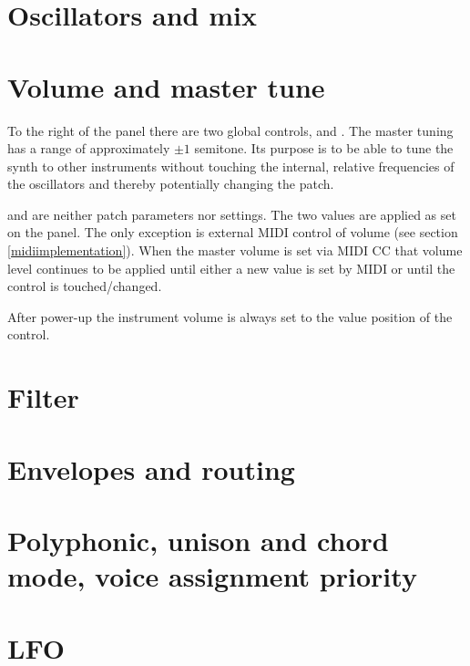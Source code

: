 \documentclass[landscape, 11pt, oneside, twoside]{report}
\newenvironment{flowtext}{\addmargin[0cm]{0cm}}{\endaddmargin} %
\begin{document}
\begin{flowtext}


\section{Oscillators and mix}\label{osc}



\pagebreak

\section{Volume and master tune}

To the right of the panel there are two global controls, \mastertune and \mastervol. The master tuning has a range of approximately $\pm 1$ semitone. Its purpose is to be able to tune the synth to other instruments without touching the internal, relative frequencies of the oscillators and thereby potentially changing the patch.

\mastervol and \mastertune are neither patch parameters nor settings. The two values are applied as set on the panel. The only exception is external MIDI control of volume (see section \ref{midiimplementation}). When the master volume is set via MIDI CC that volume level continues to be applied until either a new value is set by MIDI or until the \mastervol control is touched/changed. 

After power-up the instrument volume is always set to the value position of the \mastervol control.

\section{Filter}\label{filter}



\section{Envelopes and routing}\label{envelopes}



\section{Polyphonic, unison and chord mode, voice assignment priority}\label{poly-unison-voice}



\section{LFO}\label{lfo}


\end{flowtext}
\end{document}
